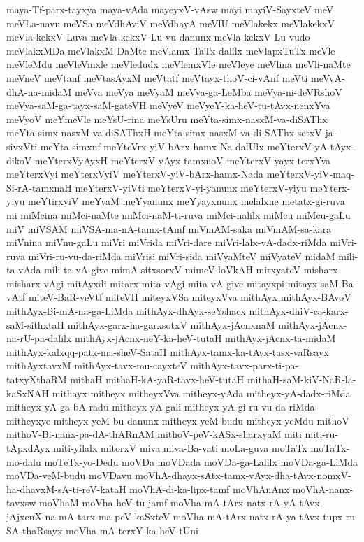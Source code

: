 {maya-Tf-parx-tayxya
maya-vAda
mayeyxV-vAsw
mayi
mayiV-SayxteV
meV
meVLa-navu
meVSa
meVdhAviV
meVdhayA
meVlU
meVlakekx
meVlakekxV
meVla-kekxV-Luva
meVla-kekxV-Lu-vu-danunx
meVla-kekxV-Lu-vudo
meVlakxMDa
meVlakxM-DaMte
meVlamx-TaTx-dalilx
meVlapxTuTx
meVle
meVleMdu
meVleVmxle
meVledudx
meVlemxVle
meVleye
meVlina
meVli-naMte
meVneV
meVtanf
meVtasAyxM
meVtatf
meVtayx-thoV-ci-vAnf
meVti
meVvA-dhA-na-midaM
meVva
meVya
meVyaM
meVya-ga-LeMba
meVya-ni-deVRshoV
meVya-saM-ga-tayx-saM-gateVH
meVyeV
meVyeY-ka-heV-tu-tAvx-nenxYva
meVyoV
meYmeVle
meYsU-rina
meYsUru
meYta-simx-nasxM-va-diSAThx
meYta-simx-nasxM-va-diSAThxH
meYta-simx-nasxM-va-di-SAThx-setxV-ja-sivxVti
meYta-simxnf
meYteVrx-yiV-bArx-hamx-Na-dalUlx
meYterxV-yA-tAyx-dikoV
meYterxVyAyxH
meYterxV-yAyx-tamxnoV
meYterxV-yayx-terxYva
meYterxVyi
meYterxVyiV
meYterxV-yiV-bArx-hamx-Nada
meYterxV-yiV-maq-Si-rA-tamxnaH
meYterxV-yiVti
meYterxV-yi-yanunx
meYterxV-yiyu
meYterx-yiyu
meYtirxyiV
meYvaM
meYyanunx
meYyayxnunx
melalxne
metatx-gi-ruva
mi
miMcina
miMci-naMte
miMci-naM-ti-ruva
miMci-nalilx
miMcu
miMcu-gaLu
miV
miVSAM
miVSA-ma-nA-tamx-tAmf
miVmAM-saka
miVmAM-sa-kara
miVnina
miVnu-gaLu
miVri
miVrida
miVri-dare
miVri-lalx-vA-dadx-riMda
miVri-ruva
miVri-ru-vu-da-riMda
miVrisi
miVri-sida
miVyaMteV
miVyateV
midaM
mili-ta-vAda
mili-ta-vA-give
mimA-sitxsorxV
mimeV-loVkAH
mirxyateV
misharx
misharx-vAgi
mitAyxdi
mitarx
mita-vAgi
mita-vA-give
mitayxpi
mitayx-saM-Ba-vAtf
miteV-BaR-veVtf
miteVH
miteyxVSa
miteyxVva
mithAyx
mithAyx-BAvoV
mithAyx-Bi-mA-na-ga-LiMda
mithAyx-dhAyx-seYshacx
mithAyx-dhiV-ca-karx-saM-sithxtaH
mithAyx-garx-ha-garxsotxV
mithAyx-jAcnxnaM
mithAyx-jAcnx-na-rU-pa-dalilx
mithAyx-jAcnx-neY-ka-heV-tutaH
mithAyx-jAcnx-ta-midaM
mithAyx-kalxqq-patx-ma-sheV-SataH
mithAyx-tamx-ka-tAvx-tasx-vaRsayx
mithAyxtavxM
mithAyx-tavx-mu-cayxteV
mithAyx-tavx-parx-ti-pa-tatxyXthaRM
mithaH
mithaH-kA-yaR-tavx-heV-tutaH
mithaH-saM-kiV-NaR-la-kaSxNAH
mithayx
mitheyx
mitheyxVva
mitheyx-yAda
mitheyx-yA-dadx-riMda
mitheyx-yA-ga-bA-radu
mitheyx-yA-gali
mitheyx-yA-gi-ru-vu-da-riMda
mitheyxye
mitheyx-yeM-bu-danunx
mitheyx-yeM-budu
mitheyx-yeMdu
mithoV
mithoV-Bi-nanx-pa-dA-thARnAM
mithoV-peV-kASx-sharxyaM
miti
miti-ru-tApxdAyx
miti-yilalx
mitorxV
miva
miva-Ba-vati
moLa-guva
moTaTx
moTaTx-mo-dalu
moTeTx-yo-Dedu
moVDa
moVDada
moVDa-ga-Lalilx
moVDa-ga-LiMda
moVDa-veM-budu
moVDavu
moVhA-dhayx-sAtx-tamx-vAyx-dha-tAvx-nomxV-ha-dhavxM-sA-ti-reV-kataH
moVhA-di-ka-lipx-tamf
moVhAnAnx
moVhA-nanx-tavxsw
moVhaM
moVha-heV-tu-jamf
moVha-mA-tArx-natx-rA-yA-tAvx-jAjxcnX-na-mA-tarx-ma-peV-kaSxteV
moVha-mA-tArx-natx-rA-ya-tAvx-tupx-ru-SA-thaRsayx
moVha-mA-terxY-ka-heV-tUni
}
